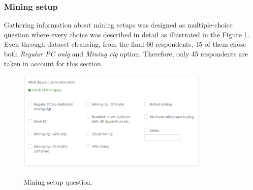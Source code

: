 \documentclass[
  printed, %
  table,   %
  nolof,     %
  nolot,     %
           oneside, color
]{fithesis3}
\begin{document}
\subsubsection{Mining setup}
Gathering information about mining setups was designed as multiple-choice question where every choice was described in detail as illustrated in the Figure \ref{pic:miningquestion}. Even through dataset cleansing, from the final 60 respondents, 15 of them chose both \textit{Regular PC only} and \textit{Mining rig} option. Therefore, only 45 respondents are taken in account for this section.
\begin{figure}[H]
\begin{center}

    \vspace{-1em}
 \includegraphics[trim={0.5cm 1.7cm 0.5cm 0.5cm},clip,width=0.85\textwidth]{Screenshot_31.png}
    \caption{Mining setup question.}
    \vspace{-1.5em}
    \label{pic:miningquestion}
\end{center}
    \end{figure}
    
\end{document}
